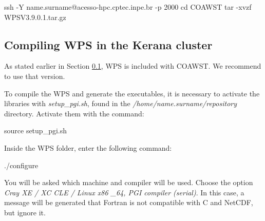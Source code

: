 \begin{bashcode}
ssh -Y name.surname@acesso-hpc.cptec.inpe.br -p 2000
cd COAWST
tar -xvzf WPSV3.9.0.1.tar.gz
\end{bashcode}
\bigskip

\subsection{Compiling WPS in the Kerana cluster}\label{wpsker}
\bigskip

\begin{tcolorbox}[enhanced,
    grow to left by=0cm,%
    grow to right by=0cm,%
    enlarge top by=0cm,%
    enlarge bottom by=0cm,%
    tcbox raise base,
    boxrule=1.0pt,
    left=18mm,
    colframe=red!50!black,coltext=red!25!black,colback=red!10!white,
    overlay={\begin{tcbclipinterior}\fill[red!75!blue!50!white] (frame.south west)
      rectangle node[text=white,font=\sffamily\bfseries\footnotesize,rotate=0] {WARNING} ([xshift=18mm]frame.north west);\end{tcbclipinterior}}]
      As stated earlier in Section \textcolor{bleu_cite}{\ref{wpsker}}, WPS is included with COAWST. We recommend to use that version.
\end{tcolorbox}
\bigskip

\noindent To compile the WPS and generate the executables, it is necessary to activate the libraries with \textit{setup\_pgi.sh},
found in the \textit{/home/name.surname/repository} directory. Activate them with the command:
\bigskip

\begin{bashcode}
source setup_pgi.sh
\end{bashcode}
\bigskip

\noindent Inside the WPS folder, enter the following command:
\bigskip

\begin{bashcode}
./configure
\end{bashcode}
\bigskip

\noindent You will be asked which machine and compiler will be used. Choose the option 
\textit{Cray XE / XC CLE / Linux x86 \_64, PGI compiler (serial)}. In this case, a message will be generated that Fortran is not compatible 
with C and NetCDF, but ignore it.
\bigskip


